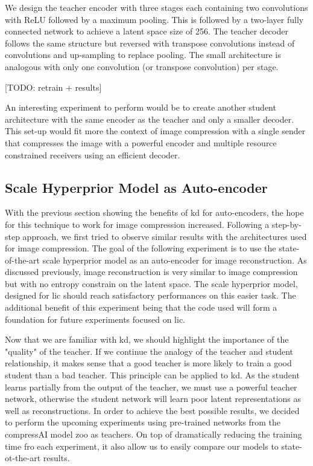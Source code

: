 We design the teacher encoder with three stages each containing two convolutions with ReLU followed by a maximum pooling. This is followed by a two-layer fully connected network to achieve a latent space size of 256. The teacher decoder follows the same structure but reversed with transpose convolutions instead of convolutions and up-sampling to replace pooling. The small architecture is analogous with only one convolution (or transpose convolution) per stage.

[TODO: retrain + results]

An interesting experiment to perform would be to create another student architecture with the same encoder as the teacher and only a smaller decoder. This set-up would fit more the context of image compression with a single sender that compresses the image with a powerful encoder and multiple resource constrained receivers using an efficient decoder.

\subsection{Scale Hyperprior Model as Auto-encoder}
\label{part_2:hyperprior}
With the previous section showing the benefits of \acrshort{kd} for auto-encoders, the hope for this technique to work for image compression increased. Following a step-by-step approach, we first tried to observe similar results with the architectures used for image compression. The goal of the following experiment is to use the state-of-the-art scale hyperprior model as an auto-encoder for image reconstruction. As discussed previously, image reconstruction is very similar to image compression but with no entropy constrain on the latent space. The scale hyperprior model, designed for \acrshort{lic} should reach satisfactory performances on this easier task. The additional benefit of this experiment being that the code used will form a foundation for future experiments focused on \acrshort{lic}.


Now that we are familiar with \acrshort{kd}, we should highlight the importance of the "quality" of the teacher. If we continue the analogy of the teacher and student relationship, it makes sense that a good teacher is more likely to train a good student than a bad teacher. This principle can be applied to \acrshort{kd}. As the student learns partially from the output of the teacher, we must use a powerful teacher network, otherwise the student network will learn poor latent representations as well as reconstructions. In order to achieve the best possible results, we decided to perform the upcoming experiments using pre-trained networks from the compressAI model zoo as teachers. On top of dramatically reducing the training time fro each experiment, it also allow us to easily compare our models to state-ot-the-art results.

